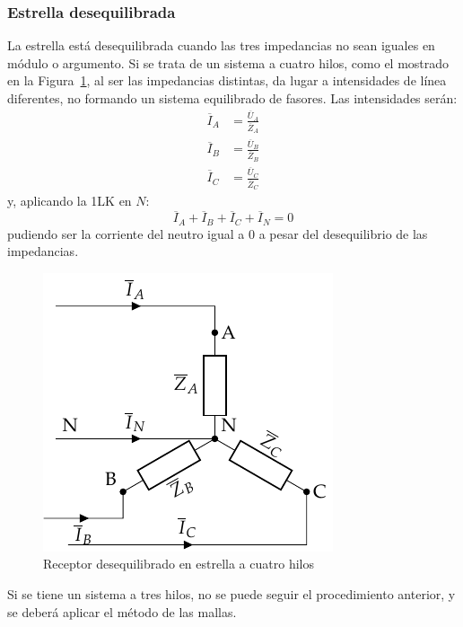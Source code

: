 	\subsubsection{Estrella desequilibrada}
	
	La estrella está desequilibrada cuando las tres impedancias no sean iguales en módulo o argumento. Si se trata de un sistema a cuatro hilos, como el mostrado en la Figura~\ref{fig.estrelladeseqiulibrado_4hilos}, al ser las impedancias distintas, da lugar a intensidades de línea diferentes, no formando un sistema equilibrado de fasores. Las intensidades serán: 
	\begin{align*}
      \overline{I}_A &= \frac{\overline{U}_A}{\overline{Z}_A}\\
      \overline{I}_B &= \frac{\overline{U}_B}{\overline{Z}_B}\\
      \overline{I}_C &= \frac{\overline{U}_C}{\overline{Z}_C}
    \end{align*}
    y, aplicando la 1LK en $N$:
    \begin{equation}
        \overline{I}_A  + \overline{I}_B + \overline{I}_C + \overline{I}_N = 0
    \end{equation}
	pudiendo ser la corriente del neutro igual a 0 a pesar del desequilibrio de las impedancias. 
	
	\begin{figure}[H]
	    \centering
	    \includegraphics{../figs/EstrellaDesequilibrado_Receptor.pdf}
	    \caption{Receptor desequilibrado en estrella a cuatro hilos}
	    \label{fig.estrelladeseqiulibrado_4hilos}
	\end{figure}
	
	Si se tiene un sistema a tres hilos, no se puede seguir el procedimiento anterior, y se deberá aplicar el método de las mallas. 

